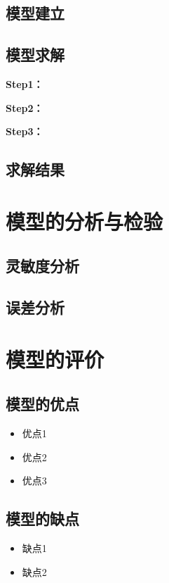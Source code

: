 \documentclass[withoutpreface,bwprint]{cumcmthesis}
\begin{document}
\subsection{模型建立}

\subsection{模型求解}

\textbf{Step1：} 

\textbf{Step2：} 

\textbf{Step3：} 

\subsection{求解结果}


\section{模型的分析与检验}

\subsection{灵敏度分析}

\subsection{误差分析}


\section{模型的评价}

\subsection{模型的优点}
\begin{itemize}[itemindent=2em]
\item 优点1
\item 优点2
\item 优点3
\end{itemize}

\subsection{模型的缺点}
\begin{itemize}[itemindent=2em]
\item 缺点1
\item 缺点2
\end{itemize}
\end{document}
